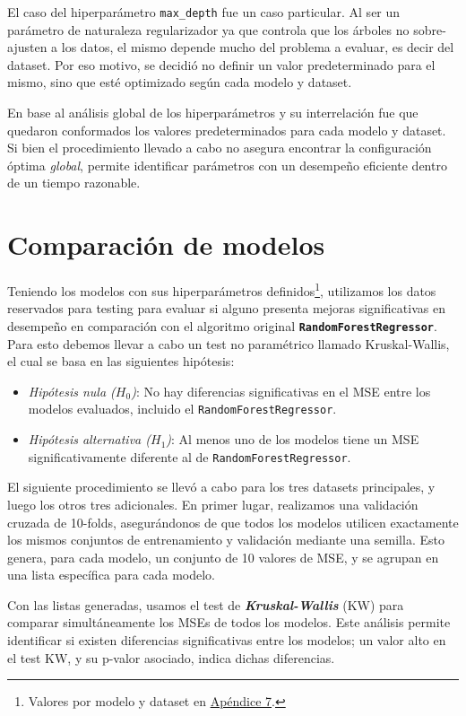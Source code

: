 El caso del hiperparámetro \texttt{max\_depth} fue un caso particular. Al ser un parámetro de naturaleza regularizador ya que controla que los árboles no sobre-ajusten a los datos, el mismo depende mucho del problema a evaluar, es decir del dataset. Por eso motivo, se decidió no definir un valor predeterminado para el mismo, sino que esté optimizado según cada modelo y dataset.

En base al análisis global de los hiperparámetros y su interrelación fue que quedaron conformados los valores predeterminados para cada modelo y dataset. Si bien el procedimiento llevado a cabo no asegura encontrar la configuración óptima \textit{global}, permite identificar parámetros con un desempeño eficiente dentro de un tiempo razonable.

\section{Comparación de modelos}

Teniendo los modelos con sus hiperparámetros definidos\footnote{Valores por modelo y dataset en \hyperref[appendix7]{Apéndice 7}.}, utilizamos los datos reservados para testing para evaluar si alguno presenta mejoras significativas en desempeño en comparación con el algoritmo original \textbf{\texttt{RandomForestRegressor}}. Para esto debemos llevar a cabo un test no paramétrico llamado Kruskal-Wallis, el cual se basa en las siguientes hipótesis:

\begin{itemize}
    \item \textit{Hipótesis nula ($H_0$)}: No hay diferencias significativas en el MSE entre los modelos evaluados, incluido el \texttt{RandomForestRegressor}.

    \item \textit{Hipótesis alternativa ($H_1$)}: Al menos uno de los modelos tiene un MSE significativamente diferente al de \texttt{RandomForestRegressor}.
\end{itemize}

El siguiente procedimiento se llevó a cabo para los tres datasets principales, y luego los otros tres adicionales. En primer lugar, realizamos una validación cruzada de 10-folds, asegurándonos de que todos los modelos utilicen exactamente los mismos conjuntos de entrenamiento y validación mediante una semilla. Esto genera, para cada modelo, un conjunto de 10 valores de MSE, y se agrupan en una lista específica para cada modelo. 

Con las listas generadas, usamos el test de \textit{\textbf{Kruskal-Wallis}} (KW) para comparar simultáneamente los MSEs de todos los modelos. Este análisis permite identificar si existen diferencias significativas entre los modelos; un valor alto en el test KW, y su p-valor asociado, indica dichas diferencias. 

